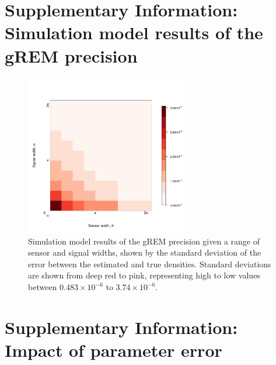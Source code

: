 

\vspace{1cm}




\clearpage
\section{Supplementary Information: Simulation model results of the gREM precision}
\setcounter{figure}{0}    

\begin{figure}[h!]
  \centering
	\includegraphics[width=7cm]{imgs/ResultStandardDeviation.pdf}
	\caption[gREM precision given a range of sensor and signal widths]{Simulation model results of the gREM precision given a range of sensor and signal widths, shown by the standard deviation of the error between the estimated and true densities. Standard deviations are shown from deep red to pink, representing high to low values between $0.483\times10^{-6}$ to $3.74\times10^{-6}$. 
        } 
	\label{f:StandardDeviation}
\end{figure}


\clearpage
\section{Supplementary Information: Impact of parameter error}
\setcounter{figure}{0}    




